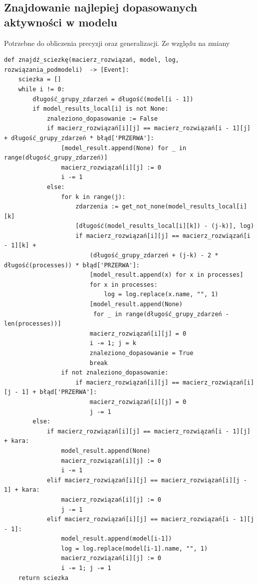 \subsection{Znajdowanie najlepiej dopasowanych aktywności w modelu}
Potrzebne do obliczenia precyzji oraz generalizacji. Ze względu na zmiany
\lstset{caption=Znajdowanie ścieżki w modelu, captionpos=b}
\lstset{label=src:traceback, frame=single}
\begin{lstlisting}[escapeinside=``]
def znajdź_sciezkę(macierz_rozwiązań, model, log, rozwiązania_podmodeli)  -> [Event]:
    sciezka = []
    while i != 0:
        długość_grupy_zdarzeń = długość(model[i - 1])
        if model_results_local[i] is not None:
            znaleziono_dopasowanie := False
            if macierz_rozwiązań[i][j] == macierz_rozwiązań[i - 1][j] + długość_grupy_zdarzeń * błąd['PRZERWA']:
                [model_result.append(None) for _ in range(długość_grupy_zdarzeń)]
                macierz_rozwiązań[i][j] := 0
                i -= 1
            else:
                for k in range(j):
                    zdarzenia := get_not_none(model_results_local[i][k]
                    [długość(model_results_local[i][k]) - (j-k)], log)
                    if macierz_rozwiązań[i][j] == macierz_rozwiązań[i - 1][k] + 
                    	(długość_grupy_zdarzeń + (j-k) - 2 * długość(processes)) * błąd['PRZERWA']:
                        [model_result.append(x) for x in processes]
                        for x in processes:
                            log = log.replace(x.name, "", 1)
                        [model_result.append(None) 
                         for _ in range(długość_grupy_zdarzeń - len(processes))]
                        macierz_rozwiązań[i][j] = 0
                        i -= 1; j = k
                        znaleziono_dopasowanie = True
                        break
                if not znaleziono_dopasowanie:
                    if macierz_rozwiązań[i][j] == macierz_rozwiązań[i][j - 1] + błąd['PRZERWA']:
                        macierz_rozwiązań[i][j] = 0
                        j -= 1
        else:
            if macierz_rozwiązań[i][j] == macierz_rozwiązań[i - 1][j] + kara:
                model_result.append(None)
                macierz_rozwiązań[i][j] := 0
                i -= 1
            elif macierz_rozwiązań[i][j] == macierz_rozwiązań[i][j - 1] + kara:
                macierz_rozwiązań[i][j] := 0
                j -= 1
            elif macierz_rozwiązań[i][j] == macierz_rozwiązań[i - 1][j - 1]:
                model_result.append(model[i-1])
                log = log.replace(model[i-1].name, "", 1)
                macierz_rozwiązań[i][j] := 0
                i -= 1; j -= 1
    return sciezka
\end{lstlisting}


